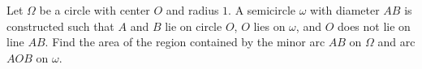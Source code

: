 Let $\Omega$ be a circle with center $O$ and radius $1$. A semicircle $\omega$ with diameter $AB$ is constructed such that $A$ and $B$ lie on circle $O$, $O$ lies on $\omega$, and $O$ does not lie on line $AB$. Find the area of the region contained by the minor arc $AB$ on $\Omega$ and arc $AOB$ on $\omega$.
